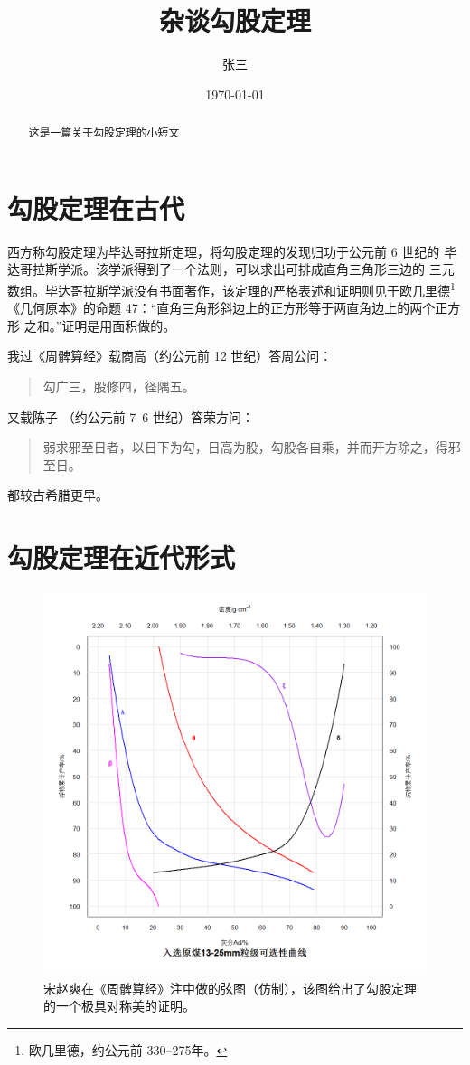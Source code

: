 \documentclass[UTF8]{ctexart}
\title{杂谈勾股定理}
\author{张三}
\date{\today}
\begin{document}
\maketitle


\begin{abstract}
这是一篇关于勾股定理的小短文
\end{abstract}

\tableofcontents

\section{勾股定理在古代}
西方称勾股定理为毕达哥拉斯定理，将勾股定理的发现归功于公元前 6 世纪的
毕达哥拉斯学派。该学派得到了一个法则，可以求出可排成直角三角形三边的
三元数组。毕达哥拉斯学派没有书面著作，该定理的严格表述和证明则见于欧几里德\footnote{欧几里德，约公元前 330--275年。}
《几何原本》的命题 47：“直角三角形斜边上的正方形等于两直角边上的两个正方形
之和。”证明是用面积做的。

我过《周髀算经》载商高（约公元前 12 世纪）答周公问：
\begin{quote}
\kaishu 勾广三，股修四，径隅五。
\end{quote}
又载陈子 （约公元前 7--6 世纪）答荣方问：
\begin{quote}
\kaishu 弱求邪至日者，以日下为勾，日高为股，勾股各自乘，并而开方除之，得邪至日。
\end{quote}
都较古希腊更早。

\section{勾股定理在近代形式}



\begin{figure}[ht]
\centering
\includegraphics[scale=0.3]{Rplot.png}
\caption{宋赵爽在《周髀算经》注中做的弦图（仿制），该图给出了勾股定理的一个极具对称美的证明。}
\label{fig:Rplot}
\end{figure}
\end{document}
